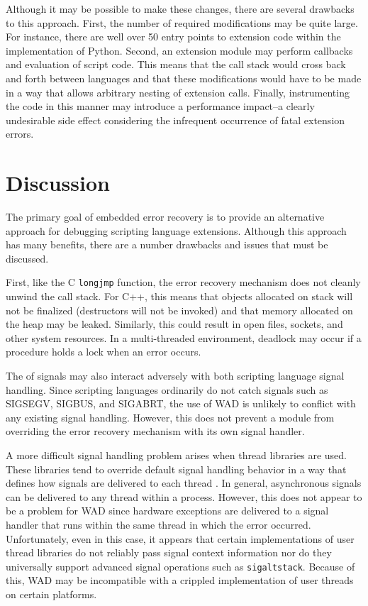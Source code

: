 Although it may be possible to make these changes, there are 
several drawbacks to this approach.  First, the number of required modifications may be
quite large.  For instance, there are well over 50 entry points to
extension code within the implementation of Python.  Second, an
extension module may perform callbacks and evaluation of script code.
This means that the call stack would cross back and forth
between languages and that these modifications would have to be made
in a way that allows arbitrary nesting of extension calls.  Finally,
instrumenting the code in this manner may introduce a performance
impact--a clearly undesirable side effect considering the infrequent
occurrence of fatal extension errors.

\section{Discussion}

The primary goal of embedded error recovery is to provide an
alternative approach for debugging scripting language extensions.
Although this approach has many benefits, there are a number
drawbacks and issues that must be discussed.

First, like the C {\tt longjmp} function, the error recovery mechanism
does not cleanly unwind the call stack.  For C++, this means that
objects allocated on stack will not be finalized (destructors will not
be invoked) and that memory allocated on the heap may be
leaked. Similarly, this could result in open files, sockets, and other
system resources. In a multi-threaded environment,
deadlock may occur if a procedure holds a lock when an error occurs.

The of signals may also interact adversely with both scripting
language signal handling. 
Since scripting languages ordinarily do not catch signals such as
SIGSEGV, SIGBUS, and SIGABRT, the use of WAD is unlikely to conflict
with any existing signal handling. However, this does not prevent a
module from overriding the error recovery mechanism with its own
signal handler.

A more difficult signal handling problem arises when thread libraries
are used. These libraries tend to override default signal handling
behavior in a way that defines how signals are delivered to each
thread \cite{thread}.  In general, asynchronous signals can be
delivered to any thread within a process.  However, this does not
appear to be a problem for WAD since hardware exceptions are delivered
to a signal handler that runs within the same thread in which the
error occurred.  Unfortunately, even in this case, it appears that
certain implementations of user thread libraries do not reliably pass
signal context information nor do they universally support advanced
signal operations such as {\tt sigaltstack}.  Because of this, WAD may
be incompatible with a crippled implementation of user threads on
certain platforms.  

